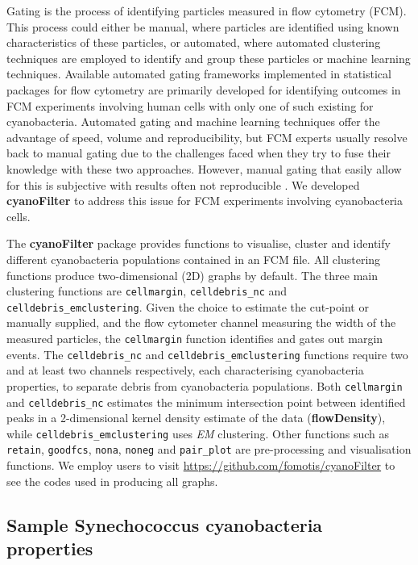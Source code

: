 \documentclass[9pt]{extarticle}
\begin{document}
Gating is the process of identifying particles measured in flow cytometry (FCM). This process could either be manual, where particles are identified using known characteristics of these particles, or automated, where automated clustering techniques are employed to identify and group these particles or machine learning techniques. Available automated gating frameworks implemented in statistical packages for flow cytometry are primarily developed for identifying outcomes in FCM experiments involving human cells with only one of such existing for cyanobacteria. Automated gating and machine learning techniques offer the advantage of speed, volume and reproducibility, but FCM experts usually resolve back to manual gating due to the challenges faced when they try to fuse their knowledge with these two approaches. However, manual gating that easily allow for this is subjective with results often not reproducible \citep{Maecker:2005, Malek:2015a}. We developed \textbf{cyanoFilter} to address this issue for FCM experiments involving cyanobacteria cells.

The \textbf{cyanoFilter} package provides functions to visualise, cluster and identify different cyanobacteria populations contained in an FCM file. All clustering functions produce two-dimensional (2D) graphs by default. The three main clustering functions are \texttt{cellmargin}, \texttt{celldebris\_nc} and \texttt{celldebris\_emclustering}. Given the choice to estimate the cut-point or manually supplied, and the flow cytometer channel measuring the width of the measured particles, the \texttt{cellmargin} function identifies and gates out margin events. The \texttt{celldebris\_nc} and \texttt{celldebris\_emclustering} functions require two and at least two channels respectively, each characterising cyanobacteria properties, to separate debris from cyanobacteria populations. Both \texttt{cellmargin} and \texttt{celldebris\_nc} estimates the minimum intersection point between identified peaks in a 2-dimensional kernel density estimate of the data (\textbf{flowDensity}), while \texttt{celldebris\_emclustering} uses \emph{EM} clustering. Other functions such as \texttt{retain}, \texttt{goodfcs}, \texttt{nona}, \texttt{noneg} and \texttt{pair\_plot} are pre-processing and visualisation functions. We employ users to visit \href{https://github.com/fomotis/cyanoFilter}{https://github.com/fomotis/cyanoFilter} to see the codes used in producing all graphs.

\subsection*{Sample Synechococcus cyanobacteria properties}
\end{document}
